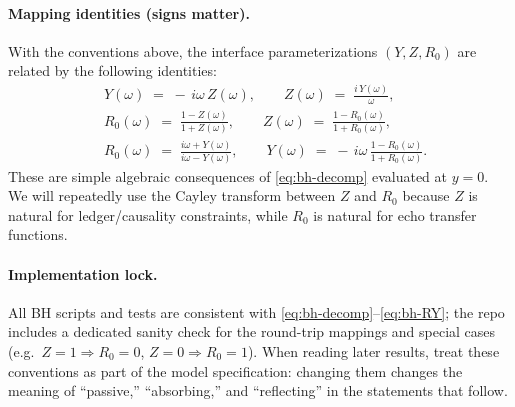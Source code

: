 \paragraph{Mapping identities (signs matter).}
With the conventions above, the interface parameterizations $(Y,Z,R_0)$ are related by the following identities:
\begin{align}
  &Y(\omega) \;=\; -\,i\omega\,Z(\omega),
  \qquad
  Z(\omega) \;=\; \frac{i\,Y(\omega)}{\omega}, \label{eq:bh-YZ}\\[4pt]
  &R_0(\omega) \;=\; \frac{1 - Z(\omega)}{1 + Z(\omega)},
  \qquad
  Z(\omega) \;=\; \frac{1 - R_0(\omega)}{1 + R_0(\omega)}, \label{eq:bh-RZ}\\[4pt]
  &R_0(\omega) \;=\; \frac{i\omega + Y(\omega)}{i\omega - Y(\omega)},
  \qquad
  Y(\omega) \;=\; -\,i\omega\,\frac{1 - R_0(\omega)}{1 + R_0(\omega)}.
  \label{eq:bh-RY}
\end{align}
These are simple algebraic consequences of \eqref{eq:bh-decomp} evaluated at $y=0$.
We will repeatedly use the Cayley transform between $Z$ and $R_0$ because $Z$ is natural for ledger/causality constraints, while $R_0$ is natural for echo transfer functions.

\paragraph{Implementation lock.}
All BH scripts and tests are consistent with \eqref{eq:bh-decomp}--\eqref{eq:bh-RY}; the repo includes a dedicated sanity check for the round-trip mappings and special cases (e.g.\ $Z=1\Rightarrow R_0=0$, $Z=0\Rightarrow R_0=1$).
When reading later results, treat these conventions as part of the model specification: changing them changes the meaning of ``passive,'' ``absorbing,'' and ``reflecting'' in the statements that follow.
